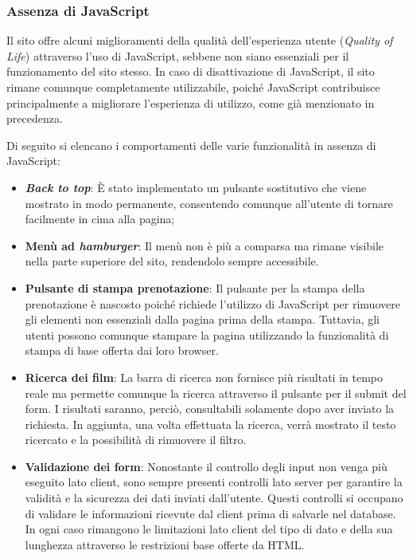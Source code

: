 \subsubsection{Assenza di JavaScript}
Il sito offre alcuni miglioramenti della qualità dell'esperienza utente (\textit{Quality of Life}) attraverso l'uso di JavaScript, sebbene non siano essenziali per il funzionamento del sito stesso. In caso di disattivazione di JavaScript, il sito rimane comunque completamente utilizzabile, poiché JavaScript contribuisce principalmente a migliorare l'esperienza di utilizzo, come già menzionato in precedenza.

Di seguito si elencano i comportamenti delle varie funzionalità in assenza di JavaScript:
\begin{itemize}
    \item \textbf{\textit{Back to top}}: È stato implementato un pulsante sostitutivo che viene mostrato in modo permanente, consentendo comunque all’utente di tornare facilmente in cima alla pagina;
    \item \textbf{Menù ad \textit{hamburger}}: Il menù non è più a comparsa ma rimane visibile nella parte superiore del sito, rendendolo sempre accessibile.
    \item \textbf{Pulsante di stampa prenotazione}: Il pulsante per la stampa della prenotazione è nascosto poiché richiede l'utilizzo di JavaScript per rimuovere gli elementi non essenziali dalla pagina prima della stampa. Tuttavia, gli utenti possono comunque stampare la pagina utilizzando la funzionalità di stampa di base offerta dai loro browser.
    \item \textbf{Ricerca dei film}: La barra di ricerca non fornisce più risultati in tempo reale ma permette comunque la ricerca attraverso il pulsante per il submit del form. I risultati saranno, perciò, consultabili solamente dopo aver inviato la richiesta.
    In aggiunta, una volta effettuata la ricerca, verrà mostrato il testo ricercato e la possibilità di rimuovere il filtro.
    \item \textbf{Validazione dei form}: Nonostante il controllo degli input non venga più eseguito lato client, sono sempre presenti controlli lato server per garantire la validità e la sicurezza dei dati inviati dall'utente. Questi controlli si occupano di validare le informazioni ricevute dal client prima di salvarle nel database.
    In ogni caso rimangono le limitazioni lato client del tipo di dato e della sua lunghezza attraverso le restrizioni base offerte da HTML.
\end{itemize}



